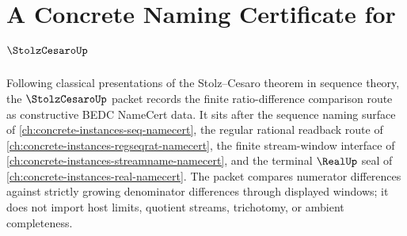 \chapter{A Concrete Naming Certificate for $\StolzCesaroUp$}
\label{ch:concrete-instances-stolz-cesaro-namecert}

Following classical presentations of the Stolz--Cesaro theorem in sequence theory, the $\StolzCesaroUp$ packet records the finite ratio-difference comparison route as constructive BEDC NameCert data. It sits after the sequence naming surface of \autoref{ch:concrete-instances-seq-namecert}, the regular rational readback route of \autoref{ch:concrete-instances-regseqrat-namecert}, the finite stream-window interface of \autoref{ch:concrete-instances-streamname-namecert}, and the terminal $\RealUp$ seal of \autoref{ch:concrete-instances-real-namecert}. The packet compares numerator differences against strictly growing denominator differences through displayed windows; it does not import host limits, quotient streams, trichotomy, or ambient completeness.

